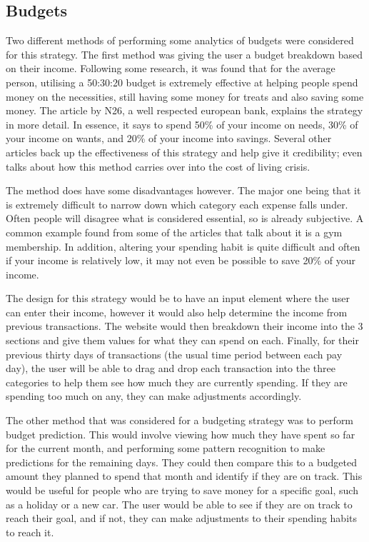 \subsection{Budgets}
Two different methods of performing some analytics of budgets were considered for this strategy. The first method was giving the user a budget breakdown based on their income. Following some research, it was found that for the average person, utilising a 50:30:20 budget is extremely effective at helping people spend money on the necessities, still having some money for treats and also saving some money. The article \cite{503020Strategy} by N26, a well respected european bank, explains the strategy in more detail. In essence, it says to spend 50\% of your income on needs, 30\% of your income on wants, and 20\% of your income into savings. Several other articles back up the effectiveness of this strategy and help give it credibility; \cite{503020InCostLivingCrisis} even talks about how this method carries over into the cost of living crisis. 

The method does have some disadvantages however. The major one being that it is extremely difficult to narrow down which category each expense falls under. Often people will disagree what is considered essential, so is already subjective. A common example found from some of the articles that talk about it is a gym membership. In addition, altering your spending habit is quite difficult and often if your income is relatively low, it may not even be possible to save 20\% of your income.

The design for this strategy would be to have an input element where the user can enter their income, however it would also help determine the income from previous transactions. The website would then breakdown their income into the 3 sections and give them values for what they can spend on each. Finally, for their previous thirty days of transactions (the usual time period between each pay day), the user will be able to drag and drop each transaction into the three categories to help them see how much they are currently spending. If they are spending too much on any, they can make adjustments accordingly.

The other method that was considered for a budgeting strategy was to perform budget prediction. This would involve viewing how much they have spent so far for the current month, and performing some pattern recognition to make predictions for the remaining days. They could then compare this to a budgeted amount they planned to spend that month and identify if they are on track. This would be useful for people who are trying to save money for a specific goal, such as a holiday or a new car. The user would be able to see if they are on track to reach their goal, and if not, they can make adjustments to their spending habits to reach it.

